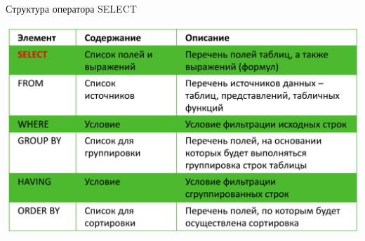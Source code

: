 \documentclass{beamer}
\begin{document}
\begin{frame}{Структура оператора SELECT}
	\begin{center}
		\includegraphics[scale=0.4]{images/Select-01.png}
	\end{center}
\end{frame}
\end{document}
